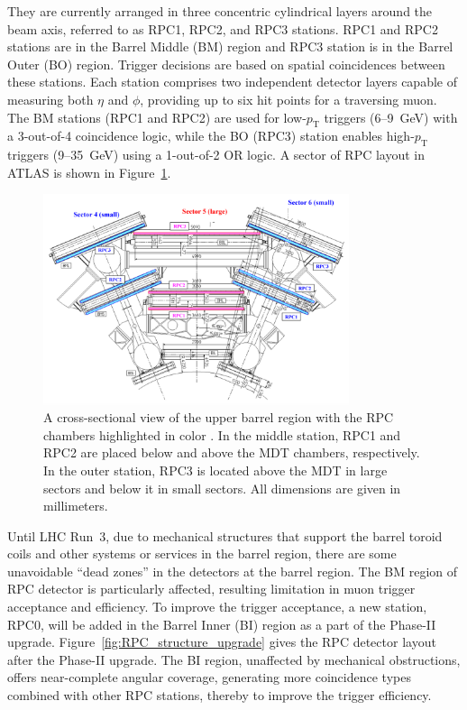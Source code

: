 They are currently arranged in three concentric cylindrical layers around the beam axis, referred to as RPC1, RPC2, and RPC3 stations. RPC1 and RPC2 stations are in the Barrel Middle (BM) region and RPC3 station is in the Barrel Outer (BO) region. Trigger decisions are based on spatial coincidences between these stations. Each station comprises two independent detector layers capable of measuring both $\eta$ and $\phi$, providing up to six hit points for a traversing muon. The BM stations (RPC1 and RPC2) are used for low-$p_\mathrm{T}$ triggers (6--9~GeV) with a 3-out-of-4 coincidence logic, while the BO (RPC3) station enables high-$p_\mathrm{T}$ triggers (9--35~GeV) using a 1-out-of-2 OR logic. A sector of RPC layout in ATLAS is shown in Figure~\ref{fig:RPC_layout}.

\begin{figure}[htbp]
  \centering
  \includegraphics[width=0.8\textwidth]{figs/chapter2/RPC_layout.png}
  \caption{A cross-sectional view of the upper barrel region with the RPC chambers highlighted in color \cite{ATLASDetector2008}. In the middle station, RPC1 and RPC2 are placed below and above the MDT chambers, respectively. In the outer station, RPC3 is located above the MDT in large sectors and below it in small sectors. All dimensions are given in millimeters.}
  \label{fig:RPC_layout}
\end{figure}

Until LHC Run~3, due to mechanical structures that support the barrel toroid coils and other systems or services in the barrel region, there are some unavoidable ``dead zones'' in the detectors at the barrel region. The BM region of RPC detector is particularly affected, resulting limitation in muon trigger acceptance and efficiency. To improve the trigger acceptance, a new station, RPC0, will be added in the Barrel Inner (BI) region as a part of the Phase-II upgrade. Figure~\ref{fig:RPC_structure_upgrade} gives the RPC detector layout after the Phase-II upgrade. The BI region, unaffected by mechanical obstructions, offers near-complete angular coverage, generating more coincidence types combined with other RPC stations, thereby to improve the trigger efficiency.

